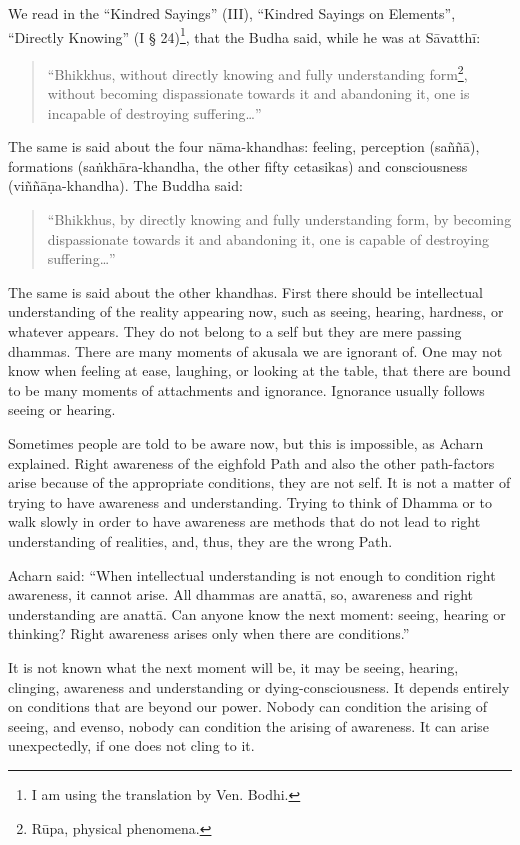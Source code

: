 We read in the ``Kindred Sayings'' (III), ``Kindred Sayings on
Elements'', ``Directly Knowing'' (I § 24)\footnote{I am using the
translation by Ven. Bodhi.}, that the Budha said,
while he was at Sāvatthī:

\begin{quote}
    
``Bhikkhus, without directly knowing and fully understanding form\footnote{Rūpa, physical
phenomena.}, without becoming
dispassionate towards it and abandoning it, one is incapable of
destroying suffering\ldots{}''
\end{quote}

The same is said about the four nāma-khandhas: feeling, perception
(saññā), formations (saṅkhāra-khandha, the other fifty cetasikas) and
consciousness (viññāṇa-khandha). The Buddha said:
\begin{quote}

``Bhikkhus, by directly knowing and fully understanding form, by
becoming dispassionate towards it and abandoning it, one is capable of
destroying suffering\ldots''
\end{quote}

The same is said about the other khandhas. First there should be
intellectual understanding of the reality appearing now, such as seeing,
hearing, hardness, or whatever appears. They do not belong to a self but
they are mere passing dhammas. There are many moments of akusala we are
ignorant of. One may not know when feeling at ease, laughing, or looking
at the table, that there are bound to be many moments of attachments and
ignorance. Ignorance usually follows seeing or hearing.

Sometimes people are told to be aware now, but this is impossible, as
Acharn explained. Right awareness of the eighfold Path and also the
other path-factors arise because of the appropriate conditions, they are
not self. It is not a matter of trying to have awareness and
understanding. Trying to think of Dhamma or to walk slowly in order to
have awareness are methods that do not lead to right understanding of
realities, and, thus, they are the wrong Path.

Acharn said: ``When intellectual understanding is not enough to
condition right awareness, it cannot arise. All dhammas are anattā, so,
awareness and right understanding are anattā. Can anyone know the next
moment: seeing, hearing or thinking? Right awareness arises only when
there are conditions.''

It is not known what the next moment will be, it may be seeing, hearing,
clinging, awareness and understanding or dying-consciousness. It depends
entirely on conditions that are beyond our power. Nobody can condition
the arising of seeing, and evenso, nobody can condition the arising of
awareness. It can arise unexpectedly, if one does not cling to it.

